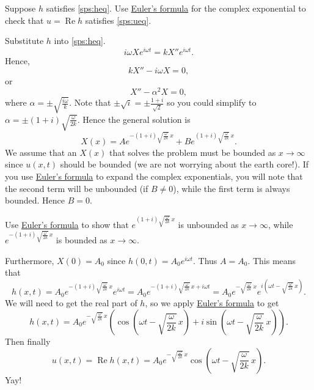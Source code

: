 \documentclass[12pt]{book}
\begin{document}
\begin{exercise}
Suppose $h$ satisfies \eqref{sps:heq}.
Use \hyperref[eulersformula]{Euler's formula} for the complex exponential to
check that $u = \operatorname{Re} h$ satisfies \eqref{sps:ueq}.
\end{exercise}

Substitute $h$ into \eqref{sps:heq}.
\begin{equation*}
i\omega X e^{i\omega t} = k X'' e^{i \omega t} .
\end{equation*}
Hence,
\begin{equation*}
k X''  - i \omega X = 0 ,
\end{equation*}
or 
\begin{equation*}
X''  - \alpha^2 X = 0 ,
\end{equation*}
where $\alpha = \pm \sqrt{\frac{i\omega}{k}}$.  Note that $\pm \sqrt{i} = \pm
\frac{1+i}{\sqrt{2}}$ so you could simplify to
$\alpha = \pm (1+i)\sqrt{\frac{\omega}{2k}}$.
Hence the general solution is
\begin{equation*}
X(x) = A e^{-(1+i)\sqrt{\frac{\omega}{2k}} \, x}
+ B e^{(1+i)\sqrt{\frac{\omega}{2k}} \, x} .
\end{equation*}
We assume that an $X(x)$ that solves the problem must be bounded as $x \to
\infty$ since $u(x,t)$ should be bounded (we are not worrying about the earth
core!).
If you use \hyperref[eulersformula]{Euler's formula} to expand the complex exponentials, you will
note that the second term will be unbounded (if $B \not = 0$),
while the first term is always bounded.  Hence $B=0$.

\begin{exercise}
Use \hyperref[eulersformula]{Euler's formula} to show that
$e^{(1+i)\sqrt{\frac{\omega}{2k}} \, x}$ is unbounded as $x \to \infty$,
while $e^{-(1+i)\sqrt{\frac{\omega}{2k}} \, x}$ is bounded
as $x \to \infty$.
\end{exercise}

Furthermore, $X(0) = A_0$ since $h(0,t) = A_0 e^{i \omega t}$.
Thus $A=A_0$.  This means that
\begin{equation*}
h(x,t) = A_0 e^{-(1+i)\sqrt{\frac{\omega}{2k}} \, x} e^{i \omega t}
=
A_0 e^{-(1+i)\sqrt{\frac{\omega}{2k}} \, x + i \omega t}
=
A_0 e^{-\sqrt{\frac{\omega}{2k}} \, x}
e^{i(\omega t - \sqrt{\frac{\omega}{2k}} \, x)} .
\end{equation*}
We will need to get the real part of $h$, so
we apply \hyperref[eulersformula]{Euler's formula} to get
\begin{equation*}
h(x,t) =
A_0 e^{-\sqrt{\frac{\omega}{2k}} \, x}
\left(\cos \left(\omega t - \sqrt{\frac{\omega}{2k}}\, x\right) + 
i \sin \left(\omega t - \sqrt{\frac{\omega}{2k}}\, x\right) \right) .
\end{equation*}
Then finally
\begin{equation*}
u(x,t) = \operatorname{Re} h(x,t) =
A_0 e^{-\sqrt{\frac{\omega}{2k}}\, x}
\cos \left(\omega t - \sqrt{\frac{\omega}{2k}}\, x\right) .
\end{equation*}
Yay!
\end{document}
